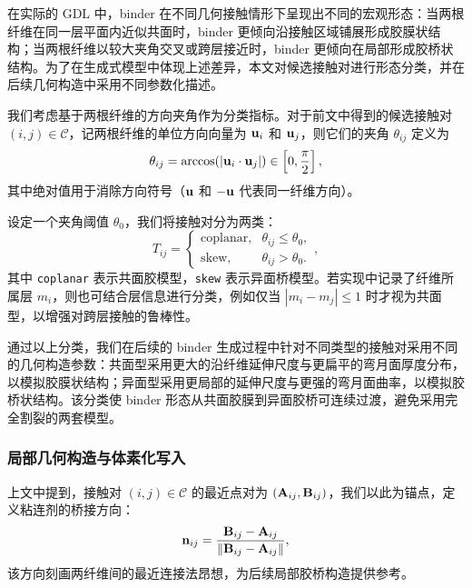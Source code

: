 在实际的 GDL 中，binder 在不同几何接触情形下呈现出不同的宏观形态：当两根纤维在同一层平面内近似共面时，binder 更倾向沿接触区域铺展形成胶膜状结构；当两根纤维以较大夹角交叉或跨层接近时，binder 更倾向在局部形成胶桥状结构。为了在生成式模型中体现上述差异，本文对候选接触对进行形态分类，并在后续几何构造中采用不同参数化描述。

我们考虑基于两根纤维的方向夹角作为分类指标。对于前文中得到的候选接触对 $(i,j)\in\mathcal{C}$，记两根纤维的单位方向向量为 $\textbf u_i$ 和 $\textbf u_j$，则它们的夹角 $\theta_{ij}$ 定义为
\begin{equation}
\theta_{ij} = \arccos\!\left(\left|\textbf u_i\cdot \textbf u_j\right|\right)\in\left[0,\dfrac{\pi}{2}\right],
\end{equation}
其中绝对值用于消除方向符号（$\textbf u$ 和 $-\textbf u$ 代表同一纤维方向）。

设定一个夹角阈值 $\theta_0$，我们将接触对分为两类：
\begin{equation}
T_{ij} = 
\begin{cases}
\text{coplanar}, & \theta_{ij}\le \theta_0,\\
\text{skew}, & \theta_{ij}>\theta_0.
\end{cases}
,
\end{equation}
其中 \texttt{coplanar} 表示共面胶模型，\texttt{skew} 表示异面桥模型。若实现中记录了纤维所属层 $m_i$，则也可结合层信息进行分类，例如仅当 $|m_i - m_j| \le 1$ 时才视为共面型，以增强对跨层接触的鲁棒性。

通过以上分类，我们在后续的 binder 生成过程中针对不同类型的接触对采用不同的几何构造参数：共面型采用更大的沿纤维延伸尺度与更扁平的弯月面厚度分布，以模拟胶膜状结构；异面型采用更局部的延伸尺度与更强的弯月面曲率，以模拟胶桥状结构。该分类使 binder 形态从共面胶膜到异面胶桥可连续过渡，避免采用完全割裂的两套模型。

\subsubsection{\textbf{局部几何构造与体素化写入}}

上文中提到，接触对 $(i,j)\in\mathcal{C}$ 的最近点对为 $(\textbf A_{ij},\textbf B_{ij})$，我们以此为锚点，定义粘连剂的桥接方向：
\begin{equation}
\textbf{n}_{ij} = \dfrac{\textbf B_{ij}-\textbf A_{ij}}{\|\textbf B_{ij}-\textbf A_{ij}\|},
\end{equation}
该方向刻画两纤维间的最近连接法昂想，为后续局部胶桥构造提供参考。

